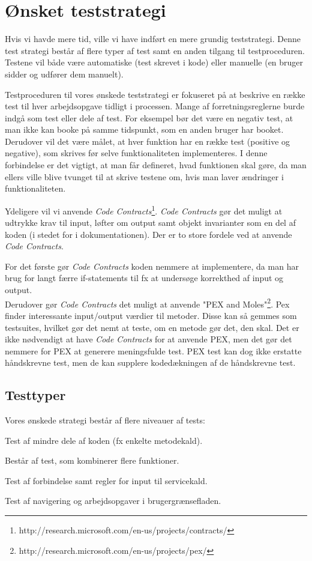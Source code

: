 \section{Ønsket teststrategi}
\label{Test_intendedStrat}
Hvis vi havde mere tid, ville vi have indført en mere grundig teststrategi. Denne test strategi består af flere typer af test samt en anden tilgang til testproceduren. Testene vil både være automatiske (test skrevet i kode) eller manuelle (en bruger sidder og udfører dem manuelt).

Testproceduren til vores ønskede teststrategi er fokuseret på at beskrive en række test til hver arbejdsopgave tidligt i processen. Mange af forretningsreglerne burde indgå som test eller dele af test. For eksempel bør det være en negativ test, at man ikke kan booke på samme tidspunkt, som en anden bruger har booket.
\\Derudover vil det være målet, at hver funktion har en række test (positive og negative), som skrives før selve funktionaliteten implementeres. I denne forbindelse er det vigtigt, at man får defineret, hvad funktionen skal gøre, da man ellers ville blive tvunget til at skrive testene om, hvis man laver ændringer i funktionaliteten.

Ydeligere vil vi anvende \textit{Code Contracts}\footnote{http://research.microsoft.com/en-us/projects/contracts/}. \textit{Code Contracts} gør det muligt at udtrykke krav til input, løfter om output samt objekt invarianter som en del af koden (i stedet for i dokumentationen). Der er to store fordele ved at anvende \textit{Code Contracts}. 

For det første gør \textit{Code Contracts} koden nemmere at implementere, da man har brug for langt færre if-statements til fx at undersøge korrekthed af input og output.
\\Derudover gør \textit{Code Contracts} det muligt at anvende "PEX and Moles"\footnote{http://research.microsoft.com/en-us/projects/pex/}. Pex finder interessante input/output værdier til metoder. Disse kan så gemmes som testsuites, hvilket gør det nemt at teste, om en metode gør det, den skal. Det er ikke nødvendigt at have \textit{Code Contracts} for at anvende PEX, men det gør det nemmere for PEX at generere meningsfulde test. PEX test kan dog ikke erstatte håndskrevne test, men de kan supplere kodedækningen af de håndskrevne test.

\subsection{Testtyper}
\label{Test_intendedStrat_types}
Vores ønskede strategi består af flere niveauer af tests:
\begin{my_description}
\item[Unit] Test af mindre dele af koden (fx enkelte metodekald).
\item[Scenario] Består af test, som kombinerer flere funktioner.
\item[Service] Test af forbindelse samt regler for input til servicekald.
\item[Brugergrænseflade] Test af navigering og arbejdsopgaver i brugergrænsefladen.
\end{my_description}

